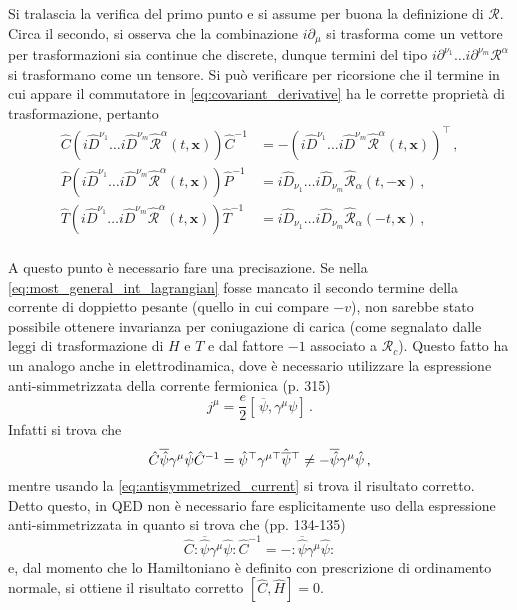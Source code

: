 \documentclass{article}
\newcommand{\adj}[1]{\overline{#1}}
\begin{document}
Si tralascia la verifica del primo punto e si assume per buona la definizione di $\mathcal{R}$. Circa il secondo, si osserva che la combinazione $i \partial_\mu$ si trasforma come un vettore per trasformazioni sia continue che discrete, dunque termini del tipo $i \partial^{\nu_1} \dots i \partial^{\nu_m} \mathcal{R}^\alpha$ si trasformano come un tensore. Si può verificare per ricorsione che il termine in cui appare il commutatore in \eqref{eq:covariant_derivative} ha le corrette proprietà di trasformazione, pertanto
\begin{align}
  \hat{C} \left( i \hat{D}^{\nu_1} \dots i \hat{D}^{\nu_m} \hat{\mathcal{R}}^\alpha (t, \mathbf{x}) \right) \hat{C}^{-1} &= - \left( i \hat{D}^{\nu_1} \dots i \hat{D}^{\nu_m} \hat{\mathcal{R}}^\alpha (t, \mathbf{x}) \right)^\top \, ,\\
  \hat{P} \left( i \hat{D}^{\nu_1} \dots i \hat{D}^{\nu_m} \hat{\mathcal{R}}^\alpha (t, \mathbf{x}) \right) \hat{P}^{-1} &= i \hat{D}_{\nu_1} \dots i \hat{D}_{\nu_m} \hat{\mathcal{R}}_\alpha (t, -\mathbf{x}) \, ,\\
  \hat{T} \left( i \hat{D}^{\nu_1} \dots i \hat{D}^{\nu_m} \hat{\mathcal{R}}^\alpha (t, \mathbf{x}) \right) \hat{T}^{-1} &= i \hat{D}_{\nu_1} \dots i \hat{D}_{\nu_m} \hat{\mathcal{R}}_\alpha (-t, \mathbf{x}) \, ,\\
\end{align}

A questo punto è necessario fare una precisazione. Se nella \eqref{eq:most_general_int_lagrangian} fosse mancato il secondo termine della corrente di doppietto pesante (quello in cui compare $-v$), non sarebbe stato possibile ottenere invarianza per coniugazione di carica (come segnalato dalle leggi di trasformazione di $H$ e $T$ e dal fattore $-1$ associato a $\mathcal{R}_c$). Questo fatto ha un analogo anche in elettrodinamica, dove è necessario utilizzare la espressione anti-simmetrizzata della corrente fermionica \cite{book:Greiner} (p. 315)
\begin{equation}
  j^\mu = \frac{e}{2} \left[ \, \adj{\psi}, \gamma^\mu \psi \right] \, .
  \label{eq:antisymmetrized_current}
\end{equation}
Infatti si trova che
\begin{equation}
  \hat{C} \adj{\hat{\psi}} \gamma^\mu \hat{\psi} \hat{C}^{-1} = \hat{\psi}^\top \gamma^{\mu \top} \hat{\adj{\psi}} \vphantom{\psi}^\top \neq - \adj{\hat{\psi}} \gamma^\mu \hat{\psi} \, ,
\end{equation}
mentre usando la \eqref{eq:antisymmetrized_current} si trova il risultato corretto. Detto questo, in QED non è necessario fare esplicitamente uso della espressione anti-simmetrizzata in quanto si trova che \cite{book:Greiner} (pp. 134-135)
\begin{equation}
  \hat{C} :\adj{\hat{\psi}} \gamma^\mu \hat{\psi}: \hat{C}^{-1} = - : \adj{\hat{\psi}} \gamma^\mu \hat{\psi} :  
\end{equation}
e, dal momento che lo Hamiltoniano è definito con prescrizione di ordinamento normale, si ottiene il risultato corretto $[\hat{C}, \hat{H}] = 0$. 
\end{document}
